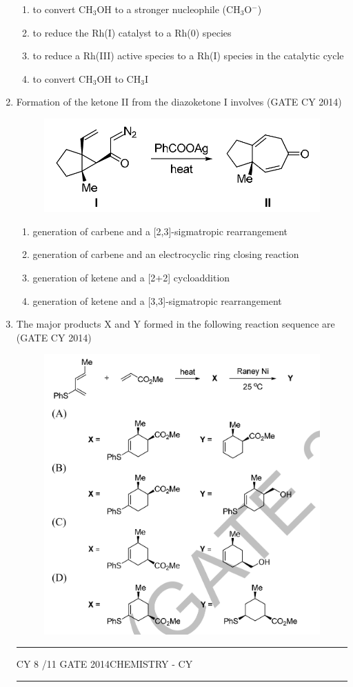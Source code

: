 \documentclass[a4paper,10pt]{exam}
\theoremstyle{remark}
\begin{document}
\begin{enumerate}
\begin{enumerate} 
    \item to convert CH$_3$OH to a stronger nucleophile (CH$_3$O$^{-}$)
    \item to reduce the Rh(I) catalyst to a Rh(0) species
    \item to reduce a Rh(III) active species to a Rh(I) species in the catalytic cycle
    \item to convert CH$_3$OH to CH$_3$I
\end{enumerate}
\item Formation of the ketone II from the diazoketone I involves \hfill{(GATE CY 2014)}

\begin{figure}[H]
    \centering
    \includegraphics[width=0.4\columnwidth]{figs/Q 46.png}
    \caption{}
    \label{fig:placeholder}
\end{figure}

\begin{enumerate} 
    \item  generation of carbene and a [2,3]-sigmatropic rearrangement 
    \item  generation of carbene and an electrocyclic ring closing reaction 
    \item  generation of ketene and a [2+2] cycloaddition 
    \item generation of ketene and a [3,3]-sigmatropic rearrangement
\end{enumerate}
\item The major products X and Y formed in the following reaction sequence are \hfill{(GATE CY 2014)}
\begin{figure}[H]
    \centering
    \includegraphics[width=0.5\columnwidth]{figs/Q 47.png}
    \caption{}
    \label{fig:placeholder}
\end{figure}
\vfill
\noindent\rule{\linewidth}{0.4pt}
CY \hfill 8 /11
\newpage
GATE 2014\hfill CHEMISTRY - CY\\
\noindent\rule{\linewidth}{0.4pt}


\end{enumerate}
\end{document}
